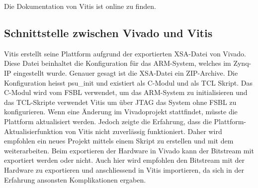 Die Dokumentation von Vitis ist online zu finden. \cite{vitis}

\subsection{Schnittstelle zwischen Vivado und Vitis}
Vitis erstellt seine Plattform aufgrund der exportierten XSA-Datei von Vivado. Diese Datei beinhaltet die Konfiguration für das ARM-System, welches im Zynq-IP eingestellt wurde. Genauer gesagt ist die XSA-Datei ein ZIP-Archive. Die Konfiguration heisst psu\_init und existiert als C-Modul und als TCL Skript. Das C-Modul wird vom FSBL verwendet, um das ARM-System zu initialisieren und das TCL-Skripte verwendet Vitis um über JTAG das System ohne FSBL zu konfigurieren. 
Wenn eine Änderung im Vivadoprojekt stattfindet, müsste die Plattform aktualisiert werden. Jedoch zeigte die Erfahrung, dass die Plattform-Aktualisierfunktion von Vitis nicht zuverlässig funktioniert. Daher wird empfohlen ein neues Projekt mittels einem Skript zu erstellen und mit dem weiterarbeiten. Beim exportieren der Hardware in Vivado kann der Bitstream mit exportiert werden oder nicht. Auch hier wird empfohlen den Bitstream mit der Hardware zu exportieren und anschliessend in Vitis importieren, da sich in der Erfahrung ansonsten Komplikationen ergaben.
